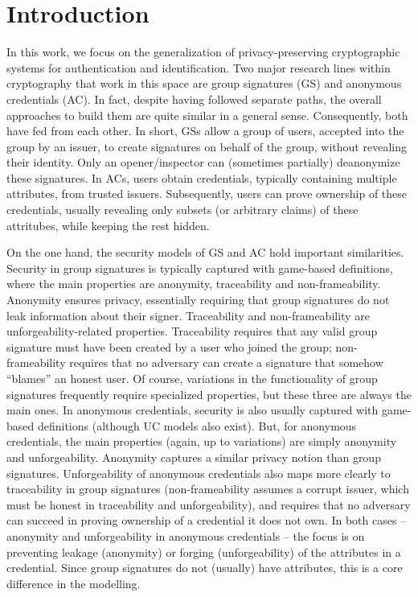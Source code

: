 \section{Introduction}
\label{sec:introduction}


In this work, we focus on the generalization of privacy-preserving cryptographic
systems for authentication and identification. Two major research lines within
cryptography that work in this space are group signatures (GS) and anonymous
credentials (AC). In fact, despite having followed separate paths, the overall
approaches to build them are quite similar in a general sense. Consequently,
both have fed from each other.
%
In short, GSs allow a group of users, accepted into the group by an issuer, to
create signatures on behalf of the group, without revealing their identity. Only
an opener/inspector can (sometimes partially) deanonymize these signatures. In
ACs, users obtain credentials, typically containing multiple attributes, from
trusted issuers. Subsequently, users can prove ownership of these credentials,
usually revealing only subsets (or arbitrary claims) of these attritubes, while
keeping the rest hidden.

On the one hand, the security models of GS and AC hold important similarities.
Security in group signatures is typically captured with game-based definitions,
where the main properties are anonymity, traceability and non-frameability.
Anonymity ensures privacy, essentially requiring that group signatures do not
leak information about their signer. Traceability and non-frameability are
unforgeability-related properties. Traceability requires that any valid group
signature must have been created by a user who joined the group;
non-frameability requires that no adversary can create a signature that somehow
``blames'' an honest user. Of course, variations in the functionality of group
signatures frequently require specialized properties, but these three are always
the main ones. In anonymous credentials, security is also usually captured with
game-based definitions (although UC models also exist). But, for anonymous
credentials, the main properties (again, up to variations) are simply anonymity
and unforgeability. Anonymity captures a similar privacy notion than group
signatures. Unforgeability of anonymous credentials also maps more clearly to
traceability in group signatures (non-frameability assumes a corrupt issuer,
which must be honest in traceability and unforgeability), and requires that
no adversary can succeed in proving ownership of a credential it does not own.
In both cases -- anonymity and unforgeability in anonymous credentials -- the
focus is on preventing leakage (anonymity) or forging (unforgeability) of the
attributes in a credential. Since group signatures do not (usually) have
attributes, this is a core difference in the modelling.

